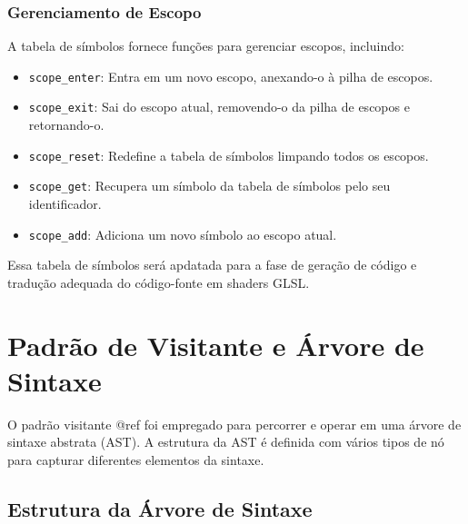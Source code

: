 \documentclass[english, 
               brazil, 
               bsc] %
               {dcomp-abntex2}
\begin{document}
\subsubsection{Gerenciamento de Escopo}

A tabela de símbolos fornece funções para gerenciar escopos, incluindo:
\begin{itemize}
    \item \texttt{scope\_enter}: Entra em um novo escopo, anexando-o à pilha de escopos.
    \item \texttt{scope\_exit}: Sai do escopo atual, removendo-o da pilha de escopos e retornando-o.
    \item \texttt{scope\_reset}: Redefine a tabela de símbolos limpando todos os escopos.
    \item \texttt{scope\_get}: Recupera um símbolo da tabela de símbolos pelo seu identificador.
    \item \texttt{scope\_add}: Adiciona um novo símbolo ao escopo atual.
\end{itemize}


Essa tabela de símbolos será apdatada para a fase de geração de código e tradução adequada do código-fonte em shaders GLSL.

\section{Padrão de Visitante e Árvore de Sintaxe}

O padrão visitante @ref foi empregado para percorrer e operar em uma árvore de sintaxe abstrata (AST). A estrutura da AST é definida com vários tipos de nó para capturar diferentes elementos da sintaxe.

\subsection{Estrutura da Árvore de Sintaxe}
\end{document}
